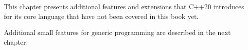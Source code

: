 This chapter presents additional features and extensions that C++20 introduces for its core language that have not been covered in this book yet.

Additional small features for generic programming are described in the next chapter.